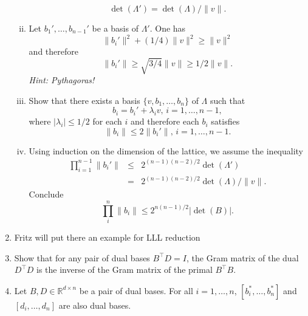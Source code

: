 \documentclass[11pt,a4paper]{article}
\begin{document}
\begin{enumerate}[1)]
\begin{enumerate}[i)]
\begin{displaymath}
     \det(Λ') = \det(Λ) / \|v\|.  
   \end{displaymath}
 \item Let $b_1', \dots , b_{n-1}'$ be a basis of $Λ'$. One has
   \begin{displaymath}
     \| b_i'\| ^2 + (1/4) \|v\|^2 ≥ \|v\|^2
   \end{displaymath}
   and therefore
   \begin{displaymath}
     \| b_i'\|   ≥ \sqrt{3/4}\|v\| ≥ 1/2 \|v\|. 
   \end{displaymath}
   \hfill{\emph{Hint: Pythagoras!}}
    \item Show that there exists a basis $\{v,b_1,\dots,b_n\}$ of $Λ$ such that
   \begin{displaymath}
     b_i = b_i' + λ_i v ,  \,   i=1,\dots,n-1,
   \end{displaymath}
   where $|λ_i | ≤ 1/2$ for each $i$ and therefore each $b_i$ satisfies
   \begin{displaymath}
     \| b_i\|  ≤  2 \| b_i'\|, \, i=1,\dots,n-1.
   \end{displaymath}

 \item Using induction on the dimension of the lattice, we assume the inequality
   \begin{eqnarray*}
     ∏_{i=1}^{n-1}  \| b_i'\| & ≤ &   2^{(n-1) (n-2)/2}  \det (Λ') \\
                            & =  & 2^{(n-1) (n-2)/2}  \det (Λ) /\|v\|. 
   \end{eqnarray*}
   Conclude
   \begin{displaymath}
     ∏_i^n \|b_i\| ≤ 2^{n (n-1)/2}  |\det (B)|.
   \end{displaymath}



 \end{enumerate}

 

 
\item Fritz will put there an example for LLL reduction


\item Show that for any pair of dual bases $B^⊤D = I$, the Gram matrix of the dual
$D^⊤D$ is the inverse of the Gram matrix of the primal $B^⊤B$.

\item Let $B,D ∈ \mathbb{R}^{d×n}$ be a pair of dual bases. For all $i = 1, \hdots,n$, $[b^\ast_i, \hdots, b^\ast_n]$ and $[d_i, \hdots , d_n]$ are also dual bases.

  
\end{enumerate}



%
%


 
\end{document}
